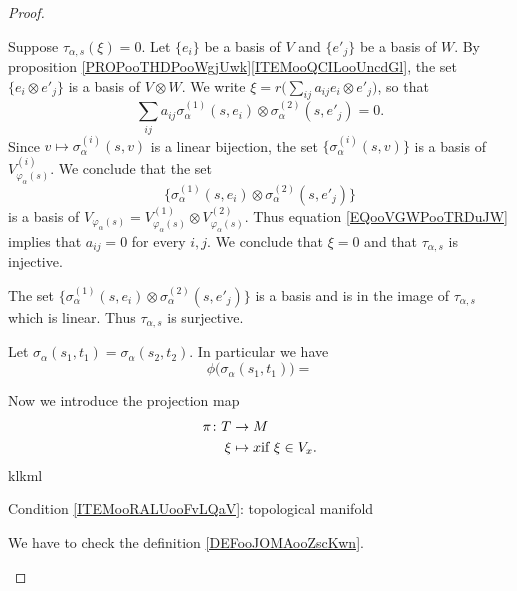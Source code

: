 \begin{proof}
\begin{subproof}
		Suppose \( \tau_{\alpha,s}(\xi)=0\). Let \( \{e_i\}\) be a basis of \( V\) and \( \{e'_j\}\) be a basis of \( W\). By proposition \ref{PROPooTHDPooWgjUwk}\ref{ITEMooQCILooUncdGl}, the set \( \{e_i\otimes e'_j\}\) is a basis of \( V\otimes W\). We write \( \xi=r\big( \sum_{ij}a_{ij}e_i\otimes e'_j \big)\), so that
		\begin{equation}		\label{EQooVGWPooTRDuJW}
			\sum_{ij}a_{ij}\sigma_{\alpha}^{(1)}(s,e_i)\otimes \sigma_{\alpha}^{(2)}(s,e'_j)=0.
		\end{equation}
		Since \( v\mapsto \sigma_{\alpha}^{(i)}(s,v)\) is a linear bijection, the set \( \{ \sigma_{\alpha}^{(i)}(s,v) \}\) is a basis of \( V_{\varphi_{\alpha}(s)}^{(i)}\). We conclude that the set
		\begin{equation}
			\{ \sigma_{\alpha}^{(1)}(s,e_i)\otimes \sigma_{\alpha}^{(2)}(s,e'_j) \}
		\end{equation}
		is a basis of \( V_{\varphi_{\alpha}(s)}=V_{\varphi_{\alpha}(s)}^{(1)}\otimes V_{\varphi_{\alpha}(s)}^{(2)}\). Thus equation \eqref{EQooVGWPooTRDuJW} implies that \( a_{ij}=0\) for every \( i,j\). We conclude that \( \xi=0\) and that \( \tau_{\alpha,s}\) is injective.

		The set \(			\{ \sigma_{\alpha}^{(1)}(s,e_i)\otimes \sigma_{\alpha}^{(2)}(s,e'_j) \}  \) is a basis and is in the image of \( \tau_{\alpha,s}\) which is linear. Thus \( \tau_{\alpha,s}\) is surjective.

				\label{ITEMooXSPDooKMXlBN}
		Let \( \sigma_{\alpha}(s_1,t_1)=\sigma_{\alpha}(s_2,t_2)\). In particular we have
		\begin{equation}
			\phi\big( \sigma_{\alpha}(s_1,t_1) \big)=
		\end{equation}
	\end{subproof}

	Now we introduce the projection map
	\begin{equation}
		\begin{aligned}
			\pi\colon T & \to M                               \\
			\xi         & \mapsto x\text{if \( \xi\in V_x\)}.
		\end{aligned}
	\end{equation}
	klkml

	\begin{proofpart}
		Condition \ref{ITEMooRALUooFvLQaV}: topological manifold
	\end{proofpart}
	We have to check the definition \ref{DEFooJOMAooZscKwn}.
	\begin{subproof}


\end{subproof}
\end{proof}
